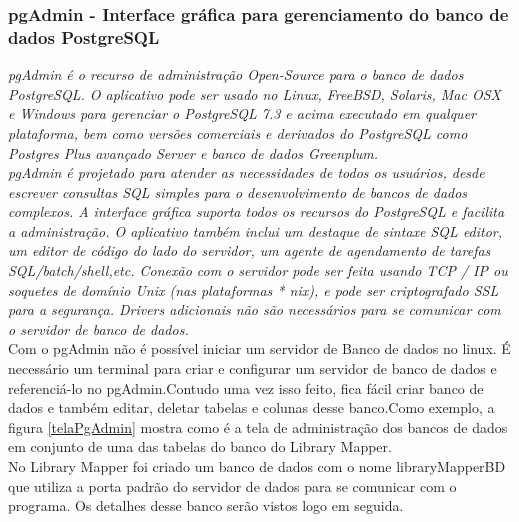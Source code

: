 \documentclass[a4paper,10pt]{article}
\begin{document}
	\subsubsection{pgAdmin - Interface gráfica para gerenciamento do banco de dados PostgreSQL}
	{\it	pgAdmin é o recurso de administração Open-Source para o banco de dados PostgreSQL. O aplicativo 
	pode ser usado no Linux, FreeBSD, Solaris, Mac OSX e Windows para gerenciar o PostgreSQL 7.3 e acima executado em qualquer
	 plataforma, bem como versões comerciais e derivados do PostgreSQL como Postgres Plus avançado Server e banco de dados Greenplum.\\
	
	pgAdmin é projetado para atender as necessidades de todos os usuários, desde escrever consultas SQL simples para o 
	desenvolvimento de bancos de dados complexos. A interface gráfica suporta todos os recursos do PostgreSQL e facilita
	 a administração. O aplicativo também inclui um destaque de sintaxe SQL editor, um editor de código do lado do servidor, 
	um agente de agendamento de tarefas SQL/batch/shell,etc. Conexão com o servidor pode ser feita usando TCP / IP ou soquetes
	 de domínio Unix (nas plataformas * nix), e pode ser criptografado SSL para a segurança. Drivers adicionais não são necessários
	 para se comunicar com o servidor de banco de dados.}\cite{pgAdmin}\\

	
	Com o pgAdmin não é possível iniciar um servidor de Banco de dados no linux. É necessário um terminal para criar
	 e configurar um servidor de banco de dados e referenciá-lo no pgAdmin.Contudo uma vez isso feito, fica fácil
	 criar banco de dados e também editar, deletar tabelas e colunas desse banco.Como exemplo, a figura \ref{telaPgAdmin} mostra como 
	é a tela de administração dos bancos de dados em conjunto de uma das tabelas do banco do Library Mapper.\\ 
	
	No Library Mapper foi criado um banco de dados com o nome libraryMapperBD que utiliza a porta padrão do servidor de dados para se comunicar com o programa.
	Os detalhes desse banco serão vistos logo em seguida.\\
\end{document}
